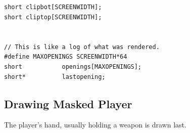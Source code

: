 \begin{verbatim}




short clipbot[SCREENWIDTH];
short cliptop[SCREENWIDTH];


// This is like a log of what was rendered.
#define MAXOPENINGS	SCREENWIDTH*64
short			openings[MAXOPENINGS];
short*			lastopening;

\end{verbatim}



\subsection{Drawing Masked Player}
The player's hand, usually holding a weapon is drawn last.\\


